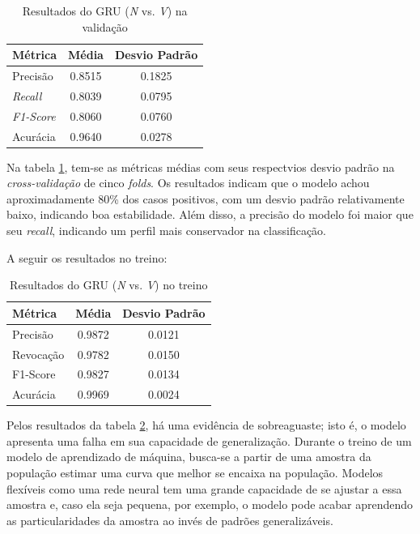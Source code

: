 \documentclass[
    12pt,                %
    openright,           %
    oneside,             %
    a4paper,             %
    brazil               %
]{abntex2}
\begin{document}
\begin{table}[H]
\centering
\caption{Resultados do GRU (\textit{N} vs. \textit{V}) na validação}
\label{tab:resultado_cv_gru_validacao}
\begin{tabular}{lcc}
\hline
\textbf{Métrica} & \textbf{Média} & \textbf{Desvio Padrão} \\
\hline
Precisão & 0.8515 & 0.1825 \\
\textit{Recall} & 0.8039  & 0.0795 \\
\textit{F1-Score} & 0.8060 & 0.0760 \\
Acurácia & 0.9640 & 0.0278 \\
\hline
\end{tabular}
\end{table}

Na tabela \ref{tab:resultado_cv_gru_validacao}, tem-se as métricas médias com seus respectvios desvio padrão na \textit{cross-validação} de cinco \textit{folds}.
Os resultados indicam que o modelo achou aproximadamente 80\% dos casos positivos, com um desvio padrão relativamente baixo, indicando boa estabilidade.
Além disso, a precisão do modelo foi maior que seu \textit{recall}, indicando um perfil mais conservador na classificação. 

A seguir os resultados no treino:

\begin{table}[H]
\centering
\caption{Resultados do GRU (\textit{N} vs. \textit{V}) no treino}
\label{tab:resultado_cv_gru_treino}
\begin{tabular}{lcc}
\hline
\textbf{Métrica} & \textbf{Média} & \textbf{Desvio Padrão} \\
\hline
Precisão & 0.9872 & 0.0121 \\
Revocação & 0.9782 & 0.0150 \\
F1-Score & 0.9827 & 0.0134 \\
Acurácia & 0.9969 & 0.0024 \\
\hline
\end{tabular}
\end{table}

Pelos resultados da tabela \ref{tab:resultado_cv_gru_treino}, há uma evidência de sobreaguaste; isto é, o modelo apresenta uma falha em sua capacidade
de generalização. Durante o treino de um modelo de aprendizado de máquina, busca-se a partir de uma amostra da população estimar uma curva que melhor
se encaixa na população. Modelos flexíveis como uma rede neural tem uma grande capacidade de se ajustar a essa amostra e, caso ela seja pequena, por exemplo,
o modelo pode acabar aprendendo as particularidades da amostra ao invés de padrões generalizáveis. 
\end{document}
